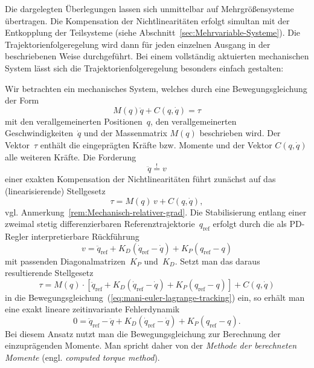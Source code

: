 Die dargelegten Überlegungen lassen sich unmittelbar auf Mehr\-größen\-systeme
übertragen. Die Kompensation der Nichtlinearitäten erfolgt simultan
mit der Entkopplung der Teilsysteme (siehe Abschnitt~\ref{sec:Mehrvariable-Systeme}).
Die Trajektorienfolgeregelung wird dann für jeden einzelnen Ausgang
in der beschriebenen Weise durchgeführt. Bei einem vollständig aktuierten
mechanischen System lässt sich die Trajektorienfolgeregelung besonders
einfach gestalten: 
\begin{remark}
\label{rem:Mechanisches-System-Feedback}Wir betrachten ein mechanisches
System, welches durch eine Bewegungsgleichung der Form 
\begin{equation}
M(q)\ddot{q}+C(q,\dot{q})=\tau\label{eq:mani-euler-lagrange-tracking}
\end{equation}
mit den verallgemeinerten Positionen~$q$, den verallgemeinerten
Geschwindigkeiten~$\dot{q}$ und der Massenmatrix $M(q)$ beschrieben
wird. Der Vektor~$\tau$ enthält die eingeprägten Kräfte bzw. Momente
und der Vektor $C(q,\dot{q})$ alle weiteren Kräfte. Die Forderung
\[
\ddot{q}\stackrel{!}{=}v
\]
einer exakten Kompensation der Nichtlinearitäten führt zunächst auf
das (linearisierende) Stellgesetz
\begin{equation}
\tau=M(q)\,v+C(q,\dot{q}),\label{eq:mech-linearisierung-feedback}
\end{equation}
vgl. Anmerkung~\ref{rem:Mechanisch-relativer-grad}. Die Stabilisierung
entlang einer zweimal stetig differenzierbaren Referenztrajektorie~$q_{\text{ref}}$
erfolgt durch die als PD-Regler interpretierbare
Rückführung
\begin{equation}
v=\ddot{q}_{\text{ref}}+K_{D}\left(\dot{q}_{\text{ref}}-\dot{q}\right)+K_{P}\left(q_{\text{ref}}-q\right)\label{eq:mech-stabiliserung}
\end{equation}
mit passenden Diagonalmatrizen~$K_{P}$ und~$K_{D}$. Setzt man
das daraus resultierende Stellgesetz 
\begin{equation}
\tau=M(q)\cdot\left[\ddot{q}_{\text{ref}}+K_{D}\left(\dot{q}_{\text{ref}}-\dot{q}\right)+K_{P}\left(q_{\text{ref}}-q\right)\right]+C(q,\dot{q})\label{eq:tau-mech-FB}
\end{equation}
in die Bewegungsgleichung~(\ref{eq:mani-euler-lagrange-tracking})
ein, so erhält man eine exakt lineare zeit\-invariante Fehlerdynamik
\[
0=\ddot{q}_{\text{ref}}-\ddot{q}+K_{D}\left(\dot{q}_{\text{ref}}-\dot{q}\right)+K_{P}\left(q_{\text{ref}}-q\right).
\]
Bei diesem Ansatz nutzt man die Bewegungsgleichung zur Berechnung
der einzuprägenden Momente. Man spricht daher von der \emph{Methode
der berechneten Momente} (engl. \emph{computed torque method}).
\end{remark}


